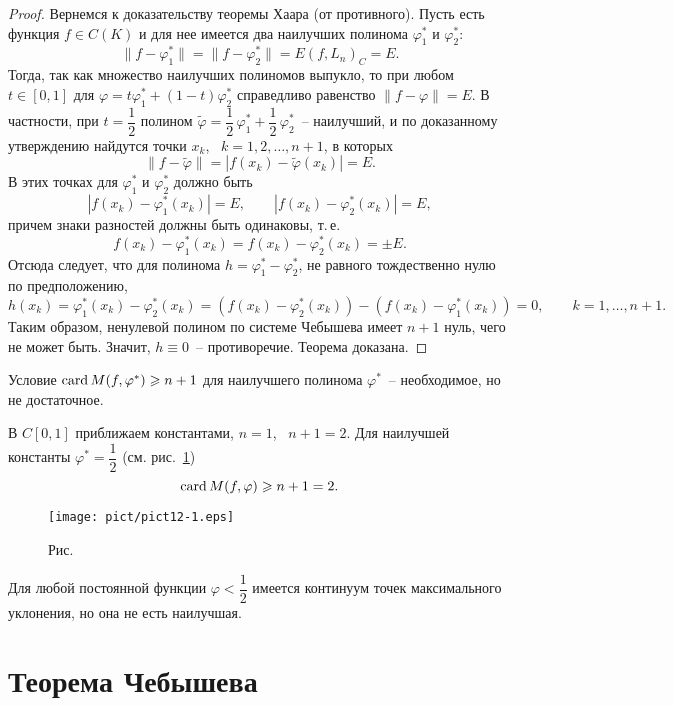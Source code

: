 \begin{proof}
Вернемся к доказательству теоремы Хаара (от противного). Пусть есть функция
$f\in C(K)$ и для нее имеется два наилучших полинома $\varphi_1^*$ и
$\varphi_2^*$:
$$
\|f-\varphi_1^*\|=\|f-\varphi_2^*\|=E(f,{L_n})_C=E.
$$
Тогда, так как множество наилучших полиномов выпукло, то при
любом $t\in[0,1]$ для $\varphi = t\varphi_1^* + (1-t)\varphi_2^*$ справедливо
равенство $\|f-\varphi\|=E$. В частности, при $t=\dfrac12$
полином $\widetilde\varphi = \dfrac12\,\varphi_1^*+\dfrac12\,\varphi_2^*$~--
наилучший, и по доказанному утверждению найдутся точки $x_k$,~ $k=1,2,\ldots,n+1$, в которых
$$
\|f-\widetilde\varphi\|=|f(x_k)-\widetilde\varphi(x_k)|=E.
$$
В этих точках для $\varphi_1^*$ и $\varphi_2^*$ должно быть
$$
|f(x_k)-\varphi_1^*(x_k)|=E,\qquad |f(x_k)-\varphi_2^*(x_k)|=E,
$$
причем знаки разностей должны быть одинаковы, т.\,е.
$$
f(x_k)-\varphi_1^*(x_k) = f(x_k)-\varphi_2^*(x_k) = \pm E.
$$
Отсюда следует, что для полинома $h=\varphi_1^*-\varphi_2^*$, не равного
тождественно нулю по предположению,
$$
h(x_k) = \varphi_1^*(x_k)-\varphi_2^*(x_k) = (f(x_k)-\varphi_2^*(x_k))-
(f(x_k)-\varphi_1^*(x_k)) = 0,\qquad k=1,\ldots,n+1.
$$
Таким образом, ненулевой полином по системе Чебышева имеет $n+1$ нуль,
чего не может быть. Значит, $h\equiv 0$~-- противоречие. Теорема
доказана.
\end{proof}

\begin{Remark}
Условие $\operatorname{card} M(f,\varphi^*)\geqslant n+1$ для наилучшего полинома $\varphi^*$~-- необходимое, но не достаточное.
\end{Remark}

\begin{Example}
В $C[0,1]$ приближаем константами, $n=1$,~ $n+1=2$. Для наилучшей константы
$\varphi^*=\dfrac12$ (см. рис.~\ref{r12-1})
$$
\operatorname{card} M(f,\varphi)\geqslant n+1=2.
$$

 \bigskip
\begin{figure}[ht]
\begin{center}
\texttt{[image: pict/pict12-1.eps]}
\end{center}
 \bigskip
 \label{r12-1}

 \centerline{Рис.~\theris}
 \bigskip
\end{figure}


Для любой постоянной функции $\varphi<\dfrac12$ имеется континуум точек
максимального уклонения, но она не есть наилучшая.
\end{Example}


\section{Теорема Чебышева}

